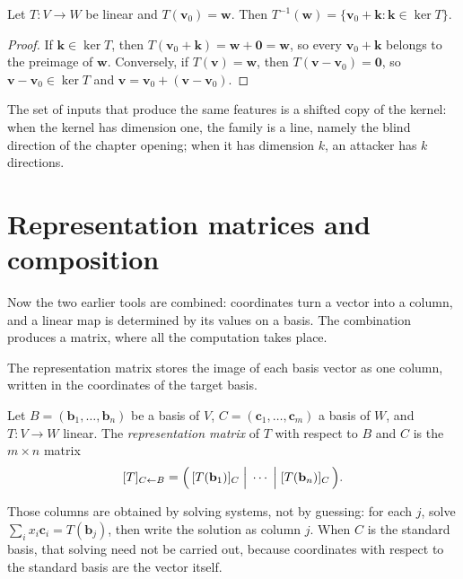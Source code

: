 \begin{proposisi}
Let $T\colon V\to W$ be linear and $T(\mathbf{v}_{0})=\mathbf{w}$. Then
$T^{-1}(\mathbf{w})=\{\mathbf{v}_{0}+\mathbf{k}:\mathbf{k}\in\ker T\}$.
\end{proposisi}

\begin{proof}
If $\mathbf{k}\in\ker T$, then $T(\mathbf{v}_{0}+\mathbf{k})=\mathbf{w}+\mathbf{0}=\mathbf{w}$,
so every $\mathbf{v}_{0}+\mathbf{k}$ belongs to the preimage of $\mathbf{w}$. Conversely, if
$T(\mathbf{v})=\mathbf{w}$, then $T(\mathbf{v}-\mathbf{v}_{0})=\mathbf{0}$, so
$\mathbf{v}-\mathbf{v}_{0}\in\ker T$ and $\mathbf{v}=\mathbf{v}_{0}+(\mathbf{v}-\mathbf{v}_{0})$.
\end{proof}

The set of inputs that produce the same features is a shifted copy of the kernel: when the kernel
has dimension one, the family is a line, namely the blind direction of the chapter opening; when it has dimension
$k$,
an attacker has $k$ directions.

\section{Representation matrices and composition}

Now the two earlier tools are combined: coordinates turn a vector into a column, and a linear
map is determined by its values on a basis. The combination produces a matrix, where all the
computation takes place.

The representation matrix stores the image of each basis vector as one column, written
in the coordinates of the target basis.

\begin{definisi}
Let $B=(\mathbf{b}_{1},\dots,\mathbf{b}_{n})$ be a basis of $V$,
$C=(\mathbf{c}_{1},\dots,\mathbf{c}_{m})$ a basis of $W$, and $T\colon V\to W$ linear.
The \emph{representation matrix} of $T$ with respect to $B$ and $C$ is the $m\times n$ matrix
\[
[T]_{C\leftarrow
B}=\Bigl(\,[T(\mathbf{b}_{1})]_{C}\;\Big|\;\cdots\;\Big|\;[T(\mathbf{b}_{n})]_{C}\,\Bigr).
\]
\end{definisi}

Those columns are obtained by solving systems, not by guessing: for each $j$,
solve $\sum_{i}x_{i}\mathbf{c}_{i}=T(\mathbf{b}_{j})$, then write the solution as
column
$j$. When $C$ is the standard basis, that solving need not be carried out, because coordinates
with respect to the standard basis are the vector itself.

